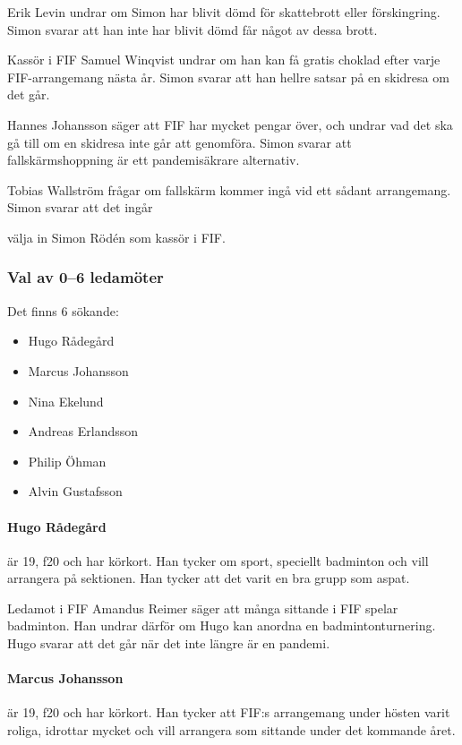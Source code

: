 \documentclass[hidelinks]{sektionsmote}
\begin{document}
Erik Levin undrar om Simon har blivit dömd för skattebrott eller förskingring.
Simon svarar att han inte har blivit dömd får något av dessa brott.

Kassör i FIF Samuel Winqvist undrar om han kan få gratis choklad efter varje FIF-arrangemang nästa år.
Simon svarar att han hellre satsar på en skidresa om det går.

Hannes Johansson säger att FIF har mycket pengar över, och undrar vad det ska gå till om en skidresa inte går att genomföra.
Simon svarar att fallskärmshoppning är ett pandemisäkrare alternativ.

Tobias Wallström frågar om fallskärm kommer ingå vid ett sådant arrangemang.
Simon svarar att det ingår

\begin{beslut}
  \item välja in Simon Rödén som kassör i FIF.
\end{beslut}


\subsubsection{Val av 0--6 ledamöter}
Det finns 6 sökande:
\begin{itemize}
    \item Hugo Rådegård
    \item Marcus Johansson
    \item Nina Ekelund
    \item Andreas Erlandsson
    \item Philip Öhman
    \item Alvin Gustafsson
\end{itemize}

\paragraph{Hugo Rådegård} är 19, f20 och har körkort.
Han tycker om sport, speciellt badminton och vill arrangera på sektionen.
Han tycker att det varit en bra grupp som aspat.

Ledamot i FIF Amandus Reimer säger att många sittande i FIF spelar badminton.
Han undrar därför om Hugo kan anordna en badmintonturnering.
Hugo svarar att det går när det inte längre är en pandemi.

\paragraph{Marcus Johansson} är 19, f20 och har körkort.
Han tycker att FIF:s arrangemang under hösten varit roliga, idrottar mycket och vill arrangera som sittande under det kommande året.
\end{document}
